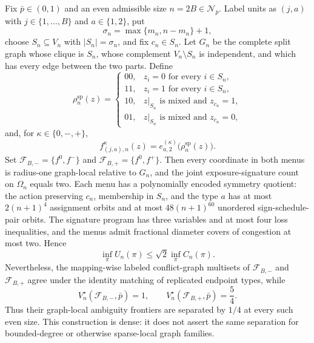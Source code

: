 Fix \(\bar p\in(0,1)\) and an even admissible size \(n=2B\in\mathcal N_{\bar p}\). Label units as \((j,a)\) with \(j\in\{1,\ldots,B\}\) and \(a\in\{1,2\}\), put
\[
 \sigma_n=\max\{m_n,n-m_n\}+1,
\]
choose \(S_n\subseteq V_n\) with \(|S_n|=\sigma_n\), and fix \(c_n\in S_n\). Let \(G_n\) be the complete split graph whose clique is \(S_n\), whose complement \(V_n\setminus S_n\) is independent, and which has every edge between the two parts. Define
\[
 \rho_n^{\mathrm{sp}}(z)=
 \begin{cases}
 00,&z_i=0\text{ for every }i\in S_n,\\
 11,&z_i=1\text{ for every }i\in S_n,\\
 10,&z|_{S_n}\text{ is mixed and }z_{c_n}=1,\\
 01,&z|_{S_n}\text{ is mixed and }z_{c_n}=0,
 \end{cases} \tag{1}
\]
and, for \(\kappa\in\{0,-,+\}\),
\[
 f^\kappa_{(j,a),n}(z)
 =e^{(\kappa)}_{a,2}\bigl(\rho_n^{\mathrm{sp}}(z)\bigr). \tag{2}
\]
Set \(\mathcal F_{B,-}=\{f^0,f^-\}\) and \(\mathcal F_{B,+}=\{f^0,f^+\}\). Then every coordinate in both menus is radius-one graph-local relative to \(G_n\), and the joint exposure-signature count on \(\Omega_n\) equals two. Each menu has a polynomially encoded symmetry quotient: the action preserving \(c_n\), membership in \(S_n\), and the type \(a\) has at most \(2(n+1)^4\) assignment orbits and at most \(48(n+1)^{60}\) unordered sign-schedule-pair orbits. The signature program has three variables and at most four loss inequalities, and the menus admit fractional diameter covers of congestion at most two. Hence
\[
 \inf_\pi U_n(\pi)\le\sqrt2\inf_\pi C_n(\pi). \tag{3}
\]
Nevertheless, the mapping-wise labeled conflict-graph multisets of \(\mathcal F_{B,-}\) and \(\mathcal F_{B,+}\) agree under the identity matching of replicated endpoint types, while
\[
 V_n^\star(\mathcal F_{B,-},\bar p)=1,
 \qquad
 V_n^\star(\mathcal F_{B,+},\bar p)=\frac54. \tag{4}
\]
Thus their graph-local ambiguity frontiers are separated by \(1/4\) at every such even size. This construction is dense: it does not assert the same separation for bounded-degree or otherwise sparse-local graph families.